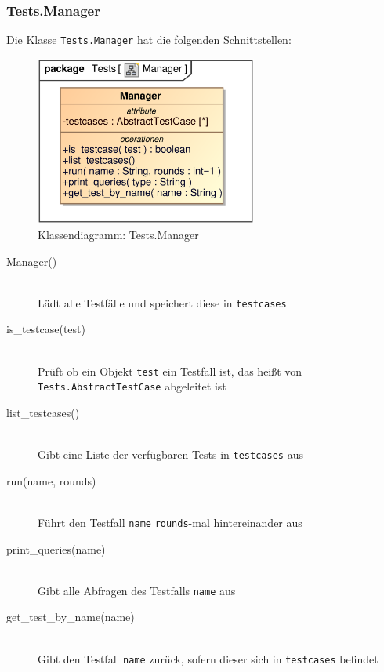 \subsubsection{Tests.Manager}
Die Klasse \verb|Tests.Manager| hat die folgenden Schnittstellen:
\begin{figure}[H]
    \myfloatalign
    \includegraphics[width=0.65\textwidth]{gfx/MtGDeepAnalysis/Manager.eps}
    \caption{Klassendiagramm: Tests.Manager}
    \label{fig:class:tests.manager}
\end{figure}
\begin{description}
    \item[Manager()] \hfill \\
    Lädt alle Testfälle und speichert diese in \verb|testcases|
    
    \item[is\_testcase(test)] \hfill \\
    Prüft ob ein Objekt \verb|test| ein Testfall ist, das heißt von \verb|Tests.AbstractTestCase| abgeleitet ist
    
    \item[list\_testcases()] \hfill \\
    Gibt eine Liste der verfügbaren Tests in \verb|testcases| aus
    
    \item[run(name, rounds)] \hfill \\
    Führt den Testfall \verb|name| \verb|rounds|-mal hintereinander aus
    
    \item[print\_queries(name)] \hfill \\
    Gibt alle Abfragen des Testfalls \verb|name| aus
    
    \item[get\_test\_by\_name(name)] \hfill \\
    Gibt den Testfall \verb|name| zurück, sofern dieser sich in \verb|testcases| befindet
\end{description}


